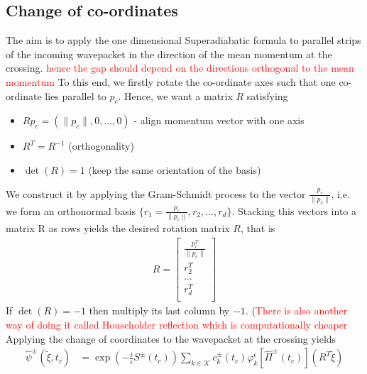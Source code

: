 \newtheorem{theorem}{Theorem}[section]
\newtheorem{corollary}{Corollary}[theorem]
\newtheorem{lemma}[theorem]{Lemma}
\usepackage{amsmath}


%
%
%
%
\subsection{Change of co-ordinates}
The aim is to apply the one dimensional Superadiabatic formula to parallel strips of the 
incoming wavepacket in the direction of the mean momentum at the crossing.
\textcolor{red}{hence the gap should depend on the directions orthogonal to the mean 
momentum}
To this end, we firstly rotate the co-ordinate 
axes such that one co-ordinate lies parallel to $p_{c}$.
Hence, we want a matrix $R$ satisfying
\begin{itemize}
  \item $Rp_c = (\|p_c\|,0,...,0)$ - align momentum vector with one axis 
  \item $R^T = R^{-1}$ (orthogonality)
  \item $\det(R) = 1$ (keep the same orientation of the basis)
\end{itemize}
We construct it by applying the Gram-Schmidt process to the vector 
$\frac{p_c}{\| p_c \|}$, i.e. we form an orthonormal basis 
$\{r_1 = \frac{p_c}{\| p_c \|}, r_2, ..., r_d \}$. Stacking this vectors into 
a matrix R as rows yields the desired rotation matrix $R$, that is 
\begin{align}
  R =
  \begin{bmatrix}
    \frac{p_c^T}{\| p_c \|} \\
    r_2^T \\
    ... \\
    r_d^T \\
  \end{bmatrix}
\end{align}
If $\det(R) = -1$ then multiply its last column by $-1$.
(\textcolor{red}{There is also another way of doing it called Householder reflection
which is computationally cheaper}
\\
Applying the change of coordinates to the wavepacket 
at the crossing yields
\begin{align}
  \hat{\psi}^{\pm}(\tilde{\xi},t_c) 
  &= 
  \exp{\left(-\frac{i}{\epsilon}S^{\pm}(t_c)\right)}
  \sum_{k \in \mathcal{K}} c_k^{\pm}(t_c) 
  \varphi_k^\epsilon[\hat{\Pi}^{\pm}(t_c)](R^{T}\tilde{\xi})
\end{align}
